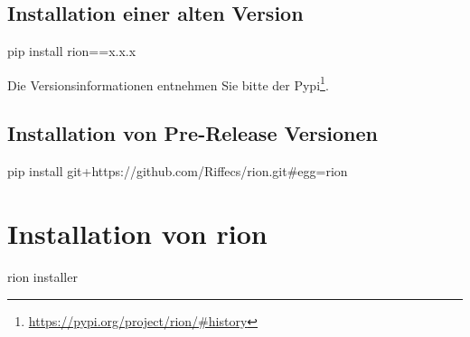 \documentclass[fleqn,10pt]{olplainarticle}
\begin{document}
\subsection{Installation einer alten Version}
\begin{listings}
pip install rion==x.x.x
\end{listings}
Die Versionsinformationen entnehmen Sie bitte der Pypi\footnote{\url{https://pypi.org/project/rion/#history}}.
\subsection{Installation von Pre-Release Versionen}
\begin{listings}
pip install git+https://github.com/Riffecs/rion.git#egg=rion

\end{listings}


\section{Installation von rion}
\begin{listings}
rion installer
\end{listings}
\end{document}
